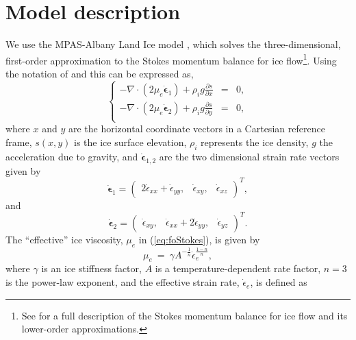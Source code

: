 \documentclass[tc, manuscript]{copernicus}
\begin{document}
\section{Model description}
We use the MPAS-Albany Land Ice model \citep[MALI;][]{hoffman2018}, which solves the three-dimensional, first-order approximation to the Stokes momentum balance for ice flow\footnote{See \citet{schoof2013} for a full description of the Stokes momentum balance for ice flow and its lower-order approximations.}. Using the notation  of \citet{perego2012} and \citet{tezaur2015a} this can be expressed as, 
\begin{equation} \label{eq:foStokes}
\left\{
\begin{array}{rcl} -\nabla \cdot (2 \mu_e \dot{\boldsymbol{\epsilon}}_1) + \rho_{i} g
\frac{\partial s}{\partial x}&=&0, \\
-\nabla \cdot (2 \mu_e \dot{\boldsymbol{\epsilon}}_2) +\rho_{i} g
\frac{\partial s}{\partial y} &=& 0, \\
\end{array}\right.
\end{equation}
where $x$ and $y$ are the horizontal coordinate vectors in a Cartesian reference frame, $s(x,y)$ is the ice surface elevation, $\rho_{i}$ represents the ice density, $g$ the acceleration due to gravity, and $\dot{\boldsymbol{\epsilon}}_{1,2}$ are the two dimensional strain rate vectors given by
\begin{equation}
\dot{\boldsymbol{\epsilon}}_1 = \left(\begin{array}{ccc}
2\dot{\epsilon}_{xx} + \dot{\epsilon}_{yy}, &\dot{\epsilon}_{xy},&
\dot{\epsilon}_{xz}\end{array}\right)^T,
\end{equation}
and
\begin{equation}
\dot{\boldsymbol{\epsilon}}_2 = \left(
\begin{array}{ccc}\dot{\epsilon}_{xy}, &
\dot{\epsilon}_{xx} + 2\dot{\epsilon}_{yy}, &\dot{\epsilon}_{yz}
\end{array}\right)^T.
\end{equation}
The ``effective'' ice viscosity, $ \mu_e$ in  (\ref{eq:foStokes}), is given by 
\begin{equation}
\label{eq:effvisc}
    \mu_{e}~=~\gamma A^{-\frac{1}{n}}\dot{\epsilon}_{e}^{\frac{1-n}{n}},
\end{equation}
where $\gamma$ is an ice stiffness factor, $A$ is a temperature-dependent rate factor, $n=3$ is the power-law exponent, and the effective strain rate, $\dot{\epsilon}_{e}$, is defined as
\end{document}
